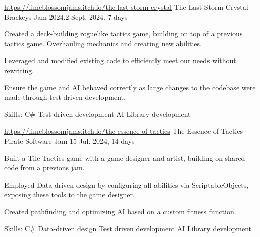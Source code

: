 

\begin{cventries}

 \cventry
 {\href{https://limeblossomjams.itch.io/the-last-storm-crystal}{https://limeblossomjams.itch.io/the-last-storm-crystal}} %
 {The Last Storm Crystal} %
 {Brackeys Jam 2024.2} %
 {Sept. 2024, 7 days} %
 {
     \begin{cvitems} %
      \item {Created a deck-building roguelike tactics game, building on top of a previous tactics game. Overhauling mechanics and creating new abilities.}
      \item {Leveraged and modified existing code to efficiently meet our needs without rewriting.}
      \item {Ensure the game and AI behaved correctly as large changes to the codebase were made through test-driven development.}
      \item {Skills: C\# \textbullet{} Test driven development \textbullet{} AI \textbullet{} Library development }
     \end{cvitems}
 }

  \cventry
 {\href{https://limeblossomjams.itch.io/the-essence-of-tactics}{https://limeblossomjams.itch.io/the-essence-of-tactics}} %
 {The Essence of Tactics} %
 {Pirate Software Jam 15} %
 {Jul. 2024, 14 days} %
 {
      \begin{cvitems} %
        \item {Built a Tile-Tactics game with a game designer and artist, building on shared code from a previous jam.}
        \item {Employed Data-driven design by configuring all abilities via ScriptableObjects, exposing these tools to the game designer.}
        \item {Created pathfinding and optimizing AI based on a custom fitness function.}
        \item {Skills: C\# \textbullet{} Data-driven design \textbullet{} Test driven development \textbullet{} AI \textbullet{} Library development }
      \end{cvitems}
 }


\end{cventries}

